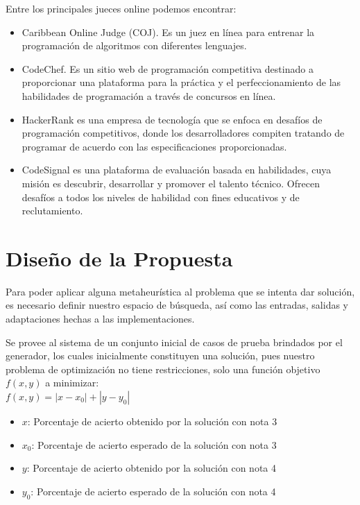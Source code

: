 \documentclass[a4paper,12pt]{book}
\begin{document}
	Entre los principales jueces online podemos encontrar: 
	\begin{itemize}
		
		\item Caribbean Online Judge (COJ). Es un juez en línea para entrenar la programación de algoritmos con diferentes lenguajes.
		
		\item CodeChef. Es un sitio web de programación competitiva destinado a proporcionar una plataforma para la práctica y el perfeccionamiento de las habilidades de programación a través de concursos en línea.
		
		\item HackerRank es una empresa de tecnología que se enfoca en desafíos de programación competitivos, donde los desarrolladores compiten tratando de programar de acuerdo con las especificaciones proporcionadas.
		
		\item CodeSignal es una plataforma de evaluación basada en habilidades, cuya misión es descubrir, desarrollar y promover el talento técnico. Ofrecen desafíos a todos los niveles de habilidad con fines educativos y de reclutamiento.
		
	\end{itemize}
		
		
\chapter{Diseño de la Propuesta}

	Para poder aplicar alguna metaheurística al problema que se intenta dar solución, es necesario definir nuestro espacio de búsqueda, así como las entradas, salidas y adaptaciones hechas a las implementaciones.
	
	Se provee al sistema de un conjunto inicial de casos de prueba brindados por el generador, los cuales inicialmente constituyen una solución, pues nuestro problema de optimización no tiene restricciones, solo una función objetivo $f(x,y)$ a minimizar: \\
	
	$f(x,y) = |x - x_0| + |y - y_0|$ \label{fo}
	
	\begin{itemize}
		\item $x$: Porcentaje de acierto obtenido por la solución con nota 3
		\item $x_0$: Porcentaje de acierto esperado de la solución con nota 3
		\item $y$: Porcentaje de acierto obtenido por la solución con nota 4
		\item $y_0$: Porcentaje de acierto esperado de la solución con nota 4
	\end{itemize}
\end{document}
